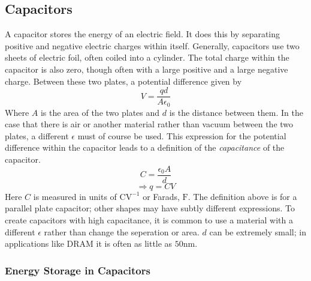 \documentclass[12pt]{report}
\begin{document}
\begin{flushleft}
\subsection*{Capacitors}

A capacitor stores the energy of an electric field. It does this by separating
positive and negative electric charges within itself. Generally, capacitors use
two sheets of electric foil, often coiled into a cylinder. The total charge 
within the capacitor is also zero, though often with a large positive and a 
large negative charge. Between these two plates, a potential difference given
by
\[V = \frac{qd}{A\epsilon_0}\]
Where \(A\) is the area of the two plates and \(d\) is the distance between 
them. In the case that there is air or another material rather than vacuum 
between the two plates, a different \(\epsilon\) must of course be used. This
expression for the potential difference within the capacitor leads to a 
definition of the \textit{capacitance} of the capacitor.
\[C = \frac{\epsilon_0A}{d}\]
\[\Rightarrow q = CV\]
Here \(C\) is measured in units of \(\mathrm{CV}^{-1}\) or Farads, 
\(\mathrm{F}\). The definition above is for a parallel plate capacitor; other
shapes may have subtly different expressions. To create capacitors with high
capacitance, it is common to use a material with a different \(\epsilon\) 
rather than change the seperation or area. \(d\) can be extremely small; in 
applications like DRAM it is often as little as \(50\mathrm{nm}\).

\subsubsection{Energy Storage in Capacitors}


\end{flushleft}
\end{document}
